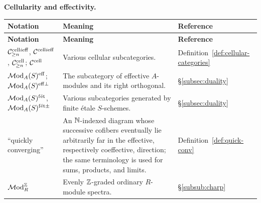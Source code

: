 \documentclass{amsart}
\numberwithin{proposition}{section}
\numberwithin{equation}{section}
\def\fet{\mathrm{f\acute et}}
\def\cell{\mathrm{cell}}
\def\tate{\mathrm{tate}}
\def\cn{\mathrm{cn}}
\begin{document}
\medskip
\noindent\textbf{Cellularity and effectivity.}
\begin{longtable}{@{}>{\raggedright\arraybackslash}p{}>{\raggedright\arraybackslash}p{}>{\raggedright\arraybackslash}p{}@{}}
\textbf{Notation} & \textbf{Meaning} & \textbf{Reference} \\
\hline
\endfirsthead
\textbf{Notation} & \textbf{Meaning} & \textbf{Reference} \\
\hline
\endhead
$\scr C^{\cell i\eff}_{\ge n}$, $\scr C^{\cell i\eff}$, $\scr C^{\cell}_{\ge n}$; $\scr C^{\cell}$ & Various cellular subcategories. & Definition~\ref{def:cellular-categories} \\
$\mathcal{M}\mathrm{od}_A(S)^{{\mathrm{eff}}}$; $\mathcal{M}\mathrm{od}_A(S)^{{\mathrm{eff}}\perp}$ & The subcategory of effective $A$-modules and its right orthogonal. & \S\ref{subsec:duality} \\
$\Mod_A(S)^\fet$, $\Mod_A(S)^{\fet\pm}$ & Various subcategories generated by finite étale $S$-schemes. & \S\ref{subsec:duality} \\
``quickly converging'' & An $\mathbb{N}$-indexed diagram whose successive cofibers eventually lie arbitrarily far in the effective, respectively coeffective, direction; the same terminology is used for sums, products, and limits. & Definition~\ref{def:quick-conv} \\
$\mathcal{M}\mathrm{od}_R^{\mathbb{Z}}$ & Evenly $\mathbb{Z}$-graded ordinary $R$-module spectra. & \S\ref{subsub:charp} \\
\end{longtable}
\end{document}

